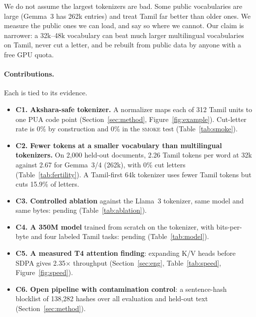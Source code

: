 \documentclass[11pt]{article}
\newcommand{\smoke}{\textsc{smoke}}
\begin{document}
We do not assume the largest tokenizers are bad.
Some public vocabularies are large (Gemma~3 has 262k entries) and treat Tamil far better than older ones.
We measure the public ones we can load, and say so where we cannot.
Our claim is narrower: a 32k--48k vocabulary can beat much larger multilingual vocabularies on Tamil, never cut a letter, and be rebuilt from public data by anyone with a free GPU quota.

\paragraph{Contributions.} Each is tied to its evidence.
\begin{itemize}
\item \textbf{C1. Akshara-safe tokenizer.} A normalizer maps each of 312 Tamil units to one PUA code point (Section~\ref{sec:method}, Figure~\ref{fig:example}). Cut-letter rate is 0\% by construction and 0\% in the \smoke{} test (Table~\ref{tab:smoke}).
\item \textbf{C2. Fewer tokens at a smaller vocabulary than multilingual tokenizers.} On 2,000 held-out documents, 2.26 Tamil tokens per word at 32k against 2.67 for Gemma~3/4 (262k), with 0\% cut letters (Table~\ref{tab:fertility}). A Tamil-first 64k tokenizer \citep{agaram2026} uses fewer Tamil tokens but cuts 15.9\% of letters.
\item \textbf{C3. Controlled ablation} against the Llama~3 tokenizer, same model and same bytes: pending (Table~\ref{tab:ablation}).
\item \textbf{C4. A 350M model} trained from scratch on the tokenizer, with bits-per-byte and four labeled Tamil tasks: pending (Table~\ref{tab:model}).
\item \textbf{C5. A measured T4 attention finding}: expanding K/V heads before SDPA gives 2.35$\times$ throughput (Section~\ref{sec:eng}, Table~\ref{tab:speed}, Figure~\ref{fig:speed}).
\item \textbf{C6. Open pipeline with contamination control}: a sentence-hash blocklist of 138,282 hashes over all evaluation and held-out text (Section~\ref{sec:method}).
\end{itemize}
\end{document}
